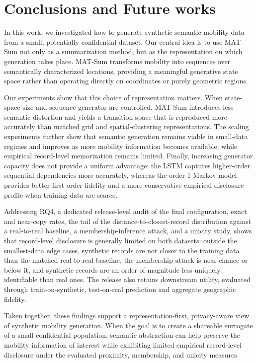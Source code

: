 \documentclass[sigconf,nonacm]{acmart}
\begin{document}
\section{Conclusions and Future works}

In this work, we investigated how to generate synthetic semantic mobility data from a small, potentially confidential dataset.
Our central idea is to use MAT-Sum not only as a summarization method, but as the representation on which generation takes place. MAT-Sum transforms mobility into sequences over semantically characterized
locations, providing a meaningful generative state space rather than operating directly on coordinates or purely geometric regions.

Our experiments show that this choice of representation matters.
When state-space size and sequence generator are controlled, MAT-Sum introduces less semantic distortion and yields a transition space that is reproduced more accurately than matched grid and spatial-clustering
representations. The scaling experiments further show that semantic generation remains viable in small-data regimes and improves as more mobility information becomes available, while empirical record-level
memorization remains limited. Finally, increasing generator capacity does not provide a uniform advantage: the LSTM captures higher-order
sequential dependencies more accurately, whereas the order-1 Markov model provides better first-order fidelity and a more conservative empirical disclosure profile when training data are scarce.

Addressing RQ4, a dedicated release-level audit of the final configuration, exact and near-copy rates, the tail of the distance-to-closest-record
distribution against a real-to-real baseline, a membership-inference attack, and a unicity study, shows
that record-level disclosure is generally limited on both datasets: outside the smallest-data edge cases, synthetic records are not closer to the training data than the matched real-to-real baseline, the membership attack is near chance or below it, and synthetic records are an order of magnitude less uniquely identifiable than real ones. The release also retains downstream utility, evaluated through train-on-synthetic, test-on-real prediction and aggregate geographic fidelity.

Taken together, these findings support a representation-first, privacy-aware view of synthetic mobility generation. When the goal is to create a shareable surrogate of a small confidential population,
semantic abstraction can help preserve the mobility information of interest while exhibiting limited empirical record-level disclosure under the evaluated proximity, membership, and unicity measures
\end{document}
